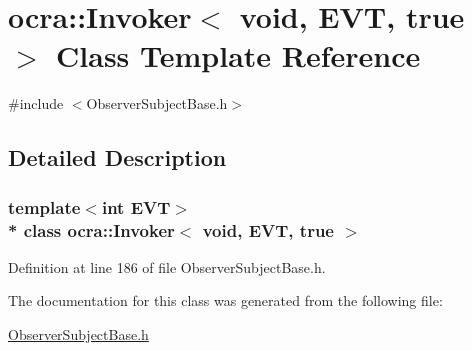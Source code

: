 \hypertarget{classocra_1_1Invoker_3_01void_00_01EVT_00_01true_01_4}{}\section{ocra\+:\+:Invoker$<$ void, E\+VT, true $>$ Class Template Reference}
\label{classocra_1_1Invoker_3_01void_00_01EVT_00_01true_01_4}


{\ttfamily \#include $<$Observer\+Subject\+Base.\+h$>$}



\subsection{Detailed Description}
\subsubsection*{template$<$int E\+VT$>$\\*
class ocra\+::\+Invoker$<$ void, E\+V\+T, true $>$}



Definition at line 186 of file Observer\+Subject\+Base.\+h.



The documentation for this class was generated from the following file\+:\begin{DoxyCompactItemize}
\item 
\hyperlink{ObserverSubjectBase_8h}{Observer\+Subject\+Base.\+h}\end{DoxyCompactItemize}
